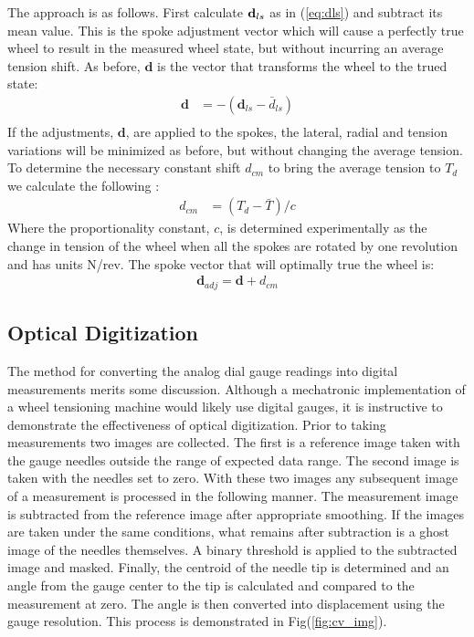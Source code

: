 \documentclass[journal]{IEEEtran}
\begin{document}
The approach is as follows.  First calculate ${\bf d}_{ls}$ as in (\ref{eq:dls}) and subtract its mean value.  This is the spoke adjustment vector which will cause a perfectly true wheel to result in the measured wheel state, but without incurring an average tension shift. As before, $\mathbf {d}$ is the vector that transforms the wheel to the trued state:
\begin{align*}
    \mathbf{d} &= -(\mathbf{d}_{ls} - \bar d_{ls})\\
\end{align*}
If the adjustments, $\mathbf {d}$, are applied to the spokes, the lateral, radial and tension variations will be minimized as before, but without changing the average tension.  To determine the necessary constant shift $d_{cm}$ to bring the average tension to $T_d$ we calculate the following :
\begin{align*}
    d_{cm} &=  (T_d - \bar T)/c
\end{align*}
Where the proportionality constant, $c$, is determined experimentally as the change in tension of the wheel when all the spokes are rotated by one revolution and has units N/rev. The spoke vector that will optimally true the wheel is:
\begin{align}
    \mathbf{d}_{adj} =\mathbf{d}  + d_{cm} 
\end{align}

\subsection{Optical Digitization}
The method for converting the analog dial gauge readings into digital measurements merits some discussion.  Although a mechatronic implementation of a wheel tensioning machine would likely use digital gauges, it is instructive to demonstrate the effectiveness of optical digitization.  Prior to taking measurements two  images are collected.  The first is a reference image taken with the gauge needles outside the range of expected data range.  The second image is taken with the needles set to zero.  With these two images any subsequent image of a measurement is processed in the following manner.  The measurement image is subtracted from the reference image after appropriate smoothing.  If the images are taken under the same conditions, what remains after subtraction is a ghost image of the needles themselves. A binary threshold is applied to the subtracted image and masked.  Finally, the centroid of the needle tip is determined and an angle from the gauge center to the tip is calculated and compared to the measurement at zero.  The angle is then converted into displacement using the gauge resolution. This process is demonstrated in Fig(\ref{fig:cv_img}).  
\end{document}
